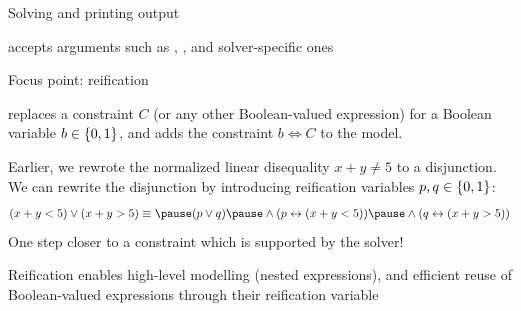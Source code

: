 \documentclass{cons-beamer}
\begin{document}
\begin{flashcardcpmpy}
\begin{frame}{Solving and printing output}
 \begin{example}[Solving]
  \vspace{-0.5em}
  
  \vspace{-0.5em}
 \end{example}

	 accepts arguments such as , , and solver-specific ones

  \begin{example}
    \vspace{-0.5em}
    
    \vspace{-0.5em}
  \end{example}
\end{frame}

\begin{frame}{Focus point: reification}
	\begin{definition}[Reification]
		 replaces a constraint $C$ (or any other Boolean-valued expression) for a Boolean  variable $b \in \{0,1\}$, and adds the constraint $b \iff C$ to the model.
	\end{definition}


  \begin{example}
	  Earlier, we rewrote the normalized linear disequality $x + y \neq 5$ to a disjunction. We can rewrite the disjunction by introducing reification variables $p, q \in \{0,1\}$:
  $$
  (x + y < 5) \lor (x + y > 5) \equiv \pause (\bvA \lor \bvB) \pause \land (\bvA \iff (x + y < 5)) \pause \land (\bvB \iff (x + y > 5))
  $$
	  One step closer to a constraint which is supported by the solver!
  	
  \end{example}

	Reification enables high-level modelling (\eg nested expressions), and efficient reuse of Boolean-valued expressions through their reification variable
\end{frame}

\end{flashcardcpmpy}
\end{document}
